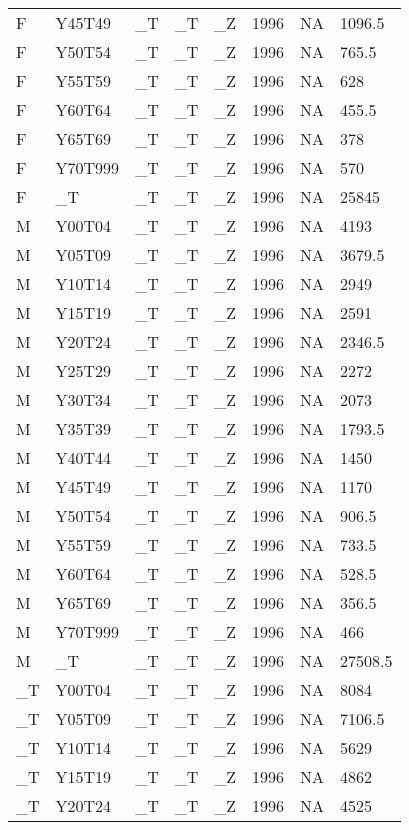 \begin{longtable}[t]{llllllll}
F & Y45T49 & \_T & \_T & \_Z & 1996 & NA & 1096.5\\
\addlinespace
F & Y50T54 & \_T & \_T & \_Z & 1996 & NA & 765.5\\
F & Y55T59 & \_T & \_T & \_Z & 1996 & NA & 628\\
F & Y60T64 & \_T & \_T & \_Z & 1996 & NA & 455.5\\
F & Y65T69 & \_T & \_T & \_Z & 1996 & NA & 378\\
F & Y70T999 & \_T & \_T & \_Z & 1996 & NA & 570\\
\addlinespace
F & \_T & \_T & \_T & \_Z & 1996 & NA & 25845\\
M & Y00T04 & \_T & \_T & \_Z & 1996 & NA & 4193\\
M & Y05T09 & \_T & \_T & \_Z & 1996 & NA & 3679.5\\
M & Y10T14 & \_T & \_T & \_Z & 1996 & NA & 2949\\
M & Y15T19 & \_T & \_T & \_Z & 1996 & NA & 2591\\
\addlinespace
M & Y20T24 & \_T & \_T & \_Z & 1996 & NA & 2346.5\\
M & Y25T29 & \_T & \_T & \_Z & 1996 & NA & 2272\\
M & Y30T34 & \_T & \_T & \_Z & 1996 & NA & 2073\\
M & Y35T39 & \_T & \_T & \_Z & 1996 & NA & 1793.5\\
M & Y40T44 & \_T & \_T & \_Z & 1996 & NA & 1450\\
\addlinespace
M & Y45T49 & \_T & \_T & \_Z & 1996 & NA & 1170\\
M & Y50T54 & \_T & \_T & \_Z & 1996 & NA & 906.5\\
M & Y55T59 & \_T & \_T & \_Z & 1996 & NA & 733.5\\
M & Y60T64 & \_T & \_T & \_Z & 1996 & NA & 528.5\\
M & Y65T69 & \_T & \_T & \_Z & 1996 & NA & 356.5\\
\addlinespace
M & Y70T999 & \_T & \_T & \_Z & 1996 & NA & 466\\
M & \_T & \_T & \_T & \_Z & 1996 & NA & 27508.5\\
\_T & Y00T04 & \_T & \_T & \_Z & 1996 & NA & 8084\\
\_T & Y05T09 & \_T & \_T & \_Z & 1996 & NA & 7106.5\\
\_T & Y10T14 & \_T & \_T & \_Z & 1996 & NA & 5629\\
\addlinespace
\_T & Y15T19 & \_T & \_T & \_Z & 1996 & NA & 4862\\
\_T & Y20T24 & \_T & \_T & \_Z & 1996 & NA & 4525\\

\end{longtable}
